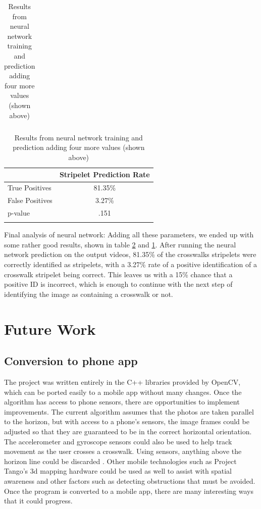 \documentclass[12pt]{ucthesis}
\begin{document}
{\begin{center}
\begin{longtable}{| l | l | l | l | l |}
    \caption{Results from neural network training and prediction adding four more values (shown above)}
    \label{tab:Results3-1} 
    \end{longtable}
\end{center}


\begin{longtable}{| l | c |}
  \hline
   & Stripelet Prediction Rate \\ \hline                   
  True Positives & 81.35\%  \\ \hline
  False Positives & 3.27\% \\ \hline
  p-value & .151  \\ \hline
\caption{Results from neural network training and prediction adding four more values (shown above)}
\label{tab:Results3-2} 
\end{longtable}


Final analysis of neural network: Adding all these parameters, we ended up with some rather good results, shown in table \ref{tab:Results3-2} and \ref{tab:Results3-1}. After running the neural network prediction on the output videos, 81.35\% of the crosswalks stripelets were correctly identified as stripelets, with a 3.27\% rate of a positive identification of a crosswalk stripelet being correct. This leaves us with a 15\% chance that a positive ID is incorrect, which is enough to continue with the next step of identifying the image as containing a crosswalk or not. 



\chapter{Future Work}
\label{future work}

\section{Conversion to phone app}

The project was written entirely in the C++ libraries provided by OpenCV, which can be ported easily to a mobile app without many changes. Once the algorithm has access to phone sensors, there are opportunities to implement improvements. The current algorithm assumes that the photos are taken parallel to the horizon, but with access to a phone's sensors, the image frames could be adjusted so that they are guaranteed to be in the correct horizontal orientation. The accelerometer and gyroscope sensors could also be used to help track movement as the user crosses a crosswalk. Using sensors, anything above the horizon line could be discarded \cite{Crosswatch2Lane}. Other mobile technologies such as Project Tango's 3d mapping hardware \cite{projectTango} could be used as well to assist with spatial awareness and other factors such as detecting obstructions that must be avoided. Once the program is converted to a mobile app, there are many interesting ways that it could progress.

}
\end{document}
